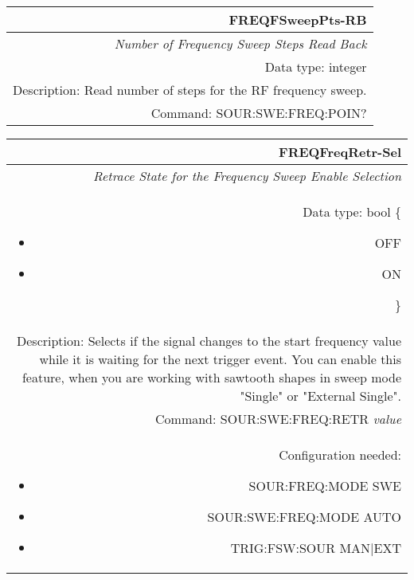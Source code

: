 \documentclass[openany]{article}
\begin{document}
		\begin{tabular}{N}
			\hline
			\bfseries FREQFSweepPts-RB \\ \hline
			\emph{Number of Frequency Sweep Steps Read Back} \\
			Data type: integer \\
			Description: Read number of steps for the RF frequency sweep. \\
			Command: SOUR:SWE:FREQ:POIN? \\

		\end{tabular}
%
		\begin{tabular}{N}
			\hline
			\bfseries FREQFreqRetr-Sel \\ \hline
			\emph{Retrace State for the Frequency Sweep Enable Selection} \\
			Data type: bool \{\begin{itemize}[noitemsep]
				\small
				\item[] OFF
				\item[] ON
			\end{itemize}\} \\
			Description: Selects if the signal changes to the start frequency value while it is waiting for the next trigger event. You can enable this feature, when you are working with sawtooth shapes in sweep mode "Single" or "External Single". \\
			Command: SOUR:SWE:FREQ:RETR \emph{value} \\
			Configuration needed: \begin{itemize}[noitemsep]
				\small
				\item[] SOUR:FREQ:MODE SWE
				\item[] SOUR:SWE:FREQ:MODE AUTO
				\item[] TRIG:FSW:SOUR MAN|EXT
			\end{itemize} \\

		\end{tabular}
\end{document}
